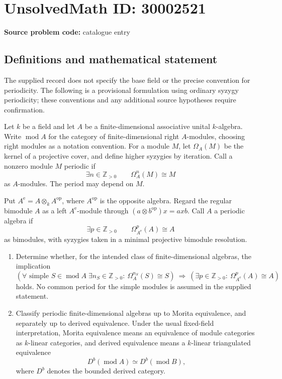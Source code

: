 \documentclass[11pt]{article}
\newcommand{\Z}{\mathbb{Z}}
\begin{document}
\section*{UnsolvedMath ID: 30002521}
\textbf{Source problem code:} catalogue entry
\subsection{Definitions and mathematical statement}
The supplied record does not specify the base field or the precise convention for periodicity. The following is a provisional formulation using ordinary syzygy periodicity; these conventions and any additional source hypotheses require confirmation.

Let \(k\) be a field and let \(A\) be a finite-dimensional associative unital \(k\)-algebra. Write \(\operatorname{mod}A\) for the category of finite-dimensional right \(A\)-modules, choosing right modules as a notation convention. For a module \(M\), let \(\Omega_A(M)\) be the kernel of a projective cover, and define higher syzygies by iteration. Call a nonzero module \(M\) periodic if
\[
\exists n\in\Z_{>0}\qquad \Omega_A^n(M)\cong M
\]
as \(A\)-modules. The period may depend on \(M\).

Put \(A^{\mathrm e}=A\otimes_k A^{\mathrm{op}}\), where \(A^{\mathrm{op}}\) is the opposite algebra. Regard the regular bimodule \(A\) as a left \(A^{\mathrm e}\)-module through \((a\otimes b^{\mathrm{op}})x=axb\). Call \(A\) a periodic algebra if
\[
\exists p\in\Z_{>0}\qquad \Omega_{A^{\mathrm e}}^p(A)\cong A
\]
as bimodules, with syzygies taken in a minimal projective bimodule resolution.

\begin{enumerate}
\item Determine whether, for the intended class of finite-dimensional algebras, the implication
\[
\left(\forall\text{ simple }S\in\operatorname{mod}A\;\exists n_S\in\Z_{>0}:\ \Omega_A^{n_S}(S)\cong S\right)
\ \Longrightarrow\ 
\left(\exists p\in\Z_{>0}:\ \Omega_{A^{\mathrm e}}^p(A)\cong A\right)
\]
holds. No common period for the simple modules is assumed in the supplied statement.
\item Classify periodic finite-dimensional algebras up to Morita equivalence, and separately up to derived equivalence. Under the usual fixed-field interpretation, Morita equivalence means an equivalence of module categories as \(k\)-linear categories, and derived equivalence means a \(k\)-linear triangulated equivalence
\[
D^b(\operatorname{mod}A)\simeq D^b(\operatorname{mod}B),
\]
where \(D^b\) denotes the bounded derived category.
\end{enumerate}
\end{document}
